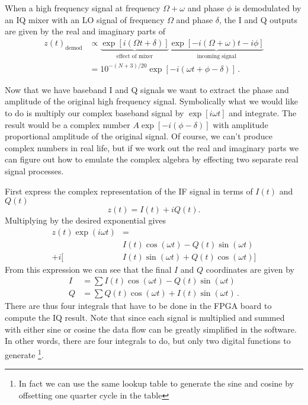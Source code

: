 
When a high frequency signal at frequency $\Omega+\omega$ and phase $\phi$ is demodulated by an IQ mixer with an LO signal of frequency $\Omega$ and phase $\delta$, the I and Q outputs are given by the real and imaginary parts of
\begin{align}
z(t)_{\textrm{demod}} &\propto \underbrace{\exp \left[i \left( \Omega t + \delta \right) \right]}_{\textrm{effect of mixer}} \underbrace{\exp \left[ -i\left( \Omega + \omega \right) t - i \phi \right]}_{\textrm{incoming signal}} \nonumber \\
&= 10^{-(N+3)/20} \exp \left[ -i \left( \omega t + \phi-\delta \right) \right] \, . \nonumber
\end{align}


Now that we have baseband I and Q signals we want to extract the phase and amplitude of the original high frequency signal.
Symbolically what we would like to do is multiply our complex baseband signal by $\exp \left[ i \omega t \right]$ and integrate.
The result would be a complex number $A \exp \left[ -i \left( \phi - \delta \right) \right]$ with amplitude proportional amplitude of the original signal.
Of course, we can't produce complex numbers in real life, but if we work out the real and imaginary parts we can figure out how to emulate the complex algebra by effecting two separate real signal processes.

First express the complex representation of the IF signal in terms of $I(t)$ and $Q(t)$ \begin{equation}
z(t) = I(t) + iQ(t). \end{equation}
Multiplying by the desired exponential gives \begin{align}
z(t) \exp \left(i \omega t \right) &= \nonumber \\
        & I(t) \cos (\omega t) - Q(t) \sin (\omega t) \nonumber \\
+ i [   & I(t) \sin (\omega t) + Q(t) \cos (\omega t) ] \end{align}
From this expression we can see that the final $I$ and $Q$ coordinates are given by \begin{align}
I &= \sum I(t)\cos(\omega t) - Q(t) \sin(\omega t) \\
Q &= \sum Q(t)\cos(\omega t) + I(t) \sin(\omega t) \, .
\end{align}
There are thus four integrals that have to be done in the FPGA board to compute the IQ result. Note that since each signal is multiplied and summed with either sine or cosine the data flow can be greatly simplified in the software. In other words, there are four integrals to do, but only two digital functions to generate \footnote{In fact we can use the same lookup table to generate the sine and cosine by offsetting one quarter cycle in the table}.

